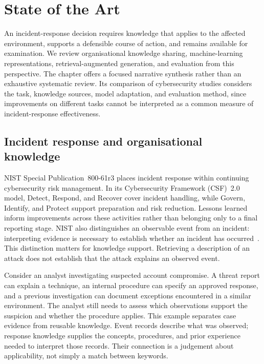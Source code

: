 \chapter{State of the Art}\label{ch:literature}

An incident-response decision requires knowledge that applies to the affected environment, supports a defensible course of action, and remains available for examination. We review organisational knowledge sharing, machine-learning representations, retrieval-augmented generation, and evaluation from this perspective. The chapter offers a focused narrative synthesis rather than an exhaustive systematic review. Its comparison of cybersecurity studies considers the task, knowledge sources, model adaptation, and evaluation method, since improvements on different tasks cannot be interpreted as a common measure of incident-response effectiveness.

\section{Incident response and organisational knowledge}
NIST Special Publication~800-61r3 places incident response within continuing cybersecurity risk management. In its Cybersecurity Framework (CSF)~2.0 model, Detect, Respond, and Recover cover incident handling, while Govern, Identify, and Protect support preparation and risk reduction. Lessons learned inform improvements across these activities rather than belonging only to a final reporting stage. NIST also distinguishes an observable event from an incident: interpreting evidence is necessary to establish whether an incident has occurred~\cite{nist2025incident}. This distinction matters for knowledge support. Retrieving a description of an attack does not establish that the attack explains an observed event.

Consider an analyst investigating suspected account compromise. A threat report can explain a technique, an internal procedure can specify an approved response, and a previous investigation can document exceptions encountered in a similar environment. The analyst still needs to assess which observations support the suspicion and whether the procedure applies. This example separates case evidence from reusable knowledge. Event records describe what was observed; response knowledge supplies the concepts, procedures, and prior experience needed to interpret those records. Their connection is a judgement about applicability, not simply a match between keywords.

